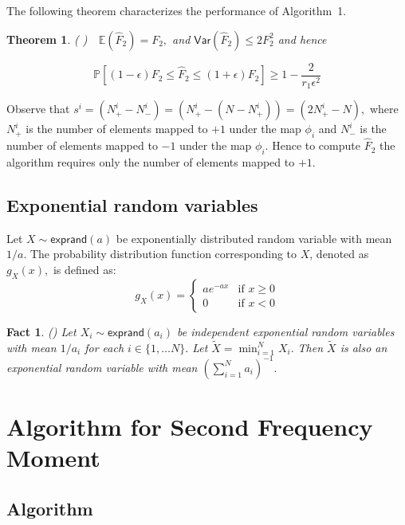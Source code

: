 \documentclass[10pt,twosided,a4paper,draft,onecolumn]{article}
\newcommand{\exprand}[1]{\mathsf{exprand}(#1)}
\newcommand{\Var}[1]{\mathsf{Var}(#1)}
\newcommand{\prob}[1]{\mathbb{P}\left[ #1 \right]}
\newcommand{\EXP}[1]{\mathbb{E}\left( #1 \right)}
\newtheorem{theorem}{Theorem}
\newtheorem{Fact}{Fact}
\begin{document}
The following theorem characterizes the performance of Algorithm~1.
\begin{theorem}
  \label{thm:ams-F2}
  (\cite[Theorem 2.2]{Alon96} )~~$\EXP{\hat{F}_2} = F_2,$ and
  $\Var{\hat{F}_2} \leq 2F_2^2$ and hence

  \begin{displaymath}
    \prob{(1-\epsilon)F_2 \leq \hat{F}_2 \leq (1+\epsilon)F_2} \geq
    1-\frac{2}{r_1\epsilon^2}
  \end{displaymath}
\end{theorem}


Observe that $s^i = (N_+^i -N_-^i) = (N_+^i - (N-N_+^i)) = (2N_+^i
-N),$ where $N_+^i$ is the number of elements mapped to $+1$ under the
map $\phi_i$ and $N_-^i$ is the number of elements mapped to $-1$
under the map $\phi_i.$ Hence to compute $\hat{F}_2$ the algorithm
requires only the number of elements mapped to $+1.$

\subsection{Exponential random variables}
\label{sec:exp}

Let $X \sim \exprand{a}$ be exponentially distributed random variable
with mean $1/a$. The probability distribution function corresponding
to $X$, denoted as $g_X(x),$ is defined as:
\begin{equation*}
  g_X(x) = \begin{cases}
    ae^{-ax} & \mbox{if } x\geq 0 \\
    0 & \mbox{if } x <0
  \end{cases}
\end{equation*}
\begin{Fact} 
  \label{fact_exp}
  (\cite[Property 1]{Mosk-Aoyama06}) Let $X_i \sim \exprand{a_i}$ be
  independent exponential random variables with mean $1/a_i$ for each
  $i \in \{1, \ldots N\}.$ Let $\tilde{X} =\min_{i=1}^{N}X_i.$ Then
  $\tilde{X}$ is also an exponential random variable with mean
  $\left( \sum\limits_{i=1}^N a_i\right)^{-1}.$
\end{Fact}


\section{Algorithm for Second Frequency Moment}
\label{sec:F2}
\subsection{Algorithm}
\label{sec:f2_algo}
\end{document}
